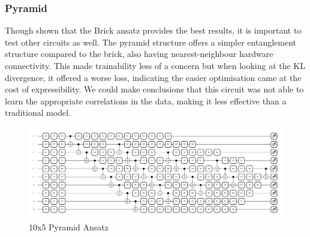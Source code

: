 \documentclass[12pt]{article}
\numberwithin{equation}{section}
\begin{document}
\subsubsection{Pyramid}
Though shown that the Brick ansatz provides the best results, it is important to 
test other circuits as well. The pyramid structure offers a simpler entanglement 
structure compared to the brick, also having nearest-neighbour hardware 
connectivity. This made trainability less of a concern but 
when looking at the KL divergence, it offered a worse loss, indicating the 
easier optimisation came at the cost of expressibility. We could make conclusions 
that this circuit was not able to learn the appropriate correlations in the data,
making it less effective than a traditional model. 
\begin{figure}[h!]
  \centering 
  \includegraphics[width=\linewidth]{ten5pyramid.png}
  \caption{10x5 Pyramid Ansatz}
  \label{fig:pyramid}
\end{figure}

\newpage
\end{document}
